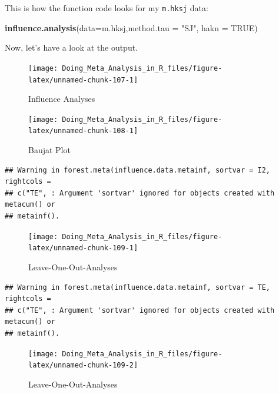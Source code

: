 \documentclass[]{book}
\newenvironment{Shaded}{\begin{snugshade}}{\end{snugshade}}
\newcommand{\DataTypeTok}[1]{\textcolor[rgb]{0.13,0.29,0.53}{#1}}
\newcommand{\KeywordTok}[1]{\textcolor[rgb]{0.13,0.29,0.53}{\textbf{#1}}}
\newcommand{\NormalTok}[1]{#1}
\newcommand{\OtherTok}[1]{\textcolor[rgb]{0.56,0.35,0.01}{#1}}
\newcommand{\StringTok}[1]{\textcolor[rgb]{0.31,0.60,0.02}{#1}}
\begin{document}
This is how the function code looks for my \texttt{m.hksj} data:

\begin{Shaded}
\begin{Highlighting}[]
\KeywordTok{influence.analysis}\NormalTok{(}\DataTypeTok{data=}\NormalTok{m.hksj,}\DataTypeTok{method.tau =} \StringTok{"SJ"}\NormalTok{, }\DataTypeTok{hakn =} \OtherTok{TRUE}\NormalTok{)}
\end{Highlighting}
\end{Shaded}

Now, let's have a look at the output.

\begin{figure}

{\centering \texttt{[image: Doing\_Meta\_Analysis\_in\_R\_files/figure-latex/unnamed-chunk-107-1]} 

}

\caption{Influence Analyses}\label{fig:unnamed-chunk-107}
\end{figure}
\begin{figure}

{\centering \texttt{[image: Doing\_Meta\_Analysis\_in\_R\_files/figure-latex/unnamed-chunk-108-1]} 

}

\caption{Baujat Plot}\label{fig:unnamed-chunk-108}
\end{figure}

\begin{verbatim}
## Warning in forest.meta(influence.data.metainf, sortvar = I2, rightcols =
## c("TE", : Argument 'sortvar' ignored for objects created with metacum() or
## metainf().
\end{verbatim}

\begin{figure}

{\centering \texttt{[image: Doing\_Meta\_Analysis\_in\_R\_files/figure-latex/unnamed-chunk-109-1]} 

}

\caption{Leave-One-Out-Analyses}\label{fig:unnamed-chunk-1091}
\end{figure}

\begin{verbatim}
## Warning in forest.meta(influence.data.metainf, sortvar = TE, rightcols =
## c("TE", : Argument 'sortvar' ignored for objects created with metacum() or
## metainf().
\end{verbatim}

\begin{figure}

{\centering \texttt{[image: Doing\_Meta\_Analysis\_in\_R\_files/figure-latex/unnamed-chunk-109-2]} 

}

\caption{Leave-One-Out-Analyses}\label{fig:unnamed-chunk-1092}
\end{figure}
\end{document}

